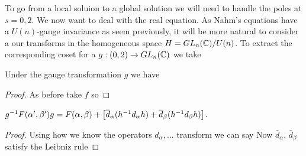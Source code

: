 \documentclass{article}
\begin{document}
To go from a local soluion to a global solution we will need to handle the poles at $s=0,2$. We now want to deal with the real equation. As Nahm's equations have a $U(n)$-gauge invariance as seem previously, it will be more natural to consider a our transforms in the homogeneous space $H = GL_n(\mathbb{C})/U(n)$. To extract the corresponding coset for a $g:(0,2) \to GL_n(\mathbb{C})$ we take 
\begin{lemma}
	Under the gauge transformation $g$ we have 
\end{lemma}
\begin{proof}
	As before take $f$ so 
\end{proof}
\begin{corollary}\label{corr: gauge transform of real equation}
	$g^{-1}F(\alpha^\prime,\beta^\prime) g = F(\alpha,\beta) + \left[ \overline{d}_\alpha(h^{-1}d_\alpha h) + \overline{d}_\beta(h^{-1} d_\beta h) \right]$.
\end{corollary}
\begin{proof}
	Using how we know the operators $d_\alpha, \dots$ transform we can say 
Now $\bar{d}_\alpha, \, \bar{d}_\beta$ satisfy the Leibniz rule
\end{proof}
\end{document}
